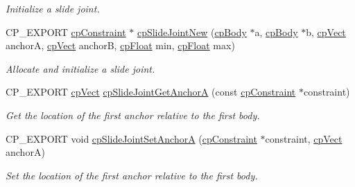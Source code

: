 \begin{DoxyCompactItemize}
\begin{DoxyCompactList}\small\item\em Initialize a slide joint. \end{DoxyCompactList}\item 
\mbox{\label{group__cp_slide_joint_gab674b3a1fe72d5cd6d6d351e7df340af}} 
C\+P\+\_\+\+E\+X\+P\+O\+RT \mbox{\hyperlink{structcp_constraint}{cp\+Constraint}} $\ast$ \mbox{\hyperlink{group__cp_slide_joint_gab674b3a1fe72d5cd6d6d351e7df340af}{cp\+Slide\+Joint\+New}} (\mbox{\hyperlink{structcp_body}{cp\+Body}} $\ast$a, \mbox{\hyperlink{structcp_body}{cp\+Body}} $\ast$b, \mbox{\hyperlink{structcp_vect}{cp\+Vect}} anchorA, \mbox{\hyperlink{structcp_vect}{cp\+Vect}} anchorB, \mbox{\hyperlink{group__basic_types_gac1ed65573e035bf892505768c852d8d3}{cp\+Float}} min, \mbox{\hyperlink{group__basic_types_gac1ed65573e035bf892505768c852d8d3}{cp\+Float}} max)
\begin{DoxyCompactList}\small\item\em Allocate and initialize a slide joint. \end{DoxyCompactList}\item 
\mbox{\label{group__cp_slide_joint_gaccd837187f30d2d436bb64687213295f}} 
C\+P\+\_\+\+E\+X\+P\+O\+RT \mbox{\hyperlink{structcp_vect}{cp\+Vect}} \mbox{\hyperlink{group__cp_slide_joint_gaccd837187f30d2d436bb64687213295f}{cp\+Slide\+Joint\+Get\+AnchorA}} (const \mbox{\hyperlink{structcp_constraint}{cp\+Constraint}} $\ast$constraint)
\begin{DoxyCompactList}\small\item\em Get the location of the first anchor relative to the first body. \end{DoxyCompactList}\item 
\mbox{\label{group__cp_slide_joint_ga5691e068b53dfa82182d5de9c47e7d4f}} 
C\+P\+\_\+\+E\+X\+P\+O\+RT void \mbox{\hyperlink{group__cp_slide_joint_ga5691e068b53dfa82182d5de9c47e7d4f}{cp\+Slide\+Joint\+Set\+AnchorA}} (\mbox{\hyperlink{structcp_constraint}{cp\+Constraint}} $\ast$constraint, \mbox{\hyperlink{structcp_vect}{cp\+Vect}} anchorA)
\begin{DoxyCompactList}\small\item\em Set the location of the first anchor relative to the first body. \end{DoxyCompactList}\item 

\end{DoxyCompactItemize}
